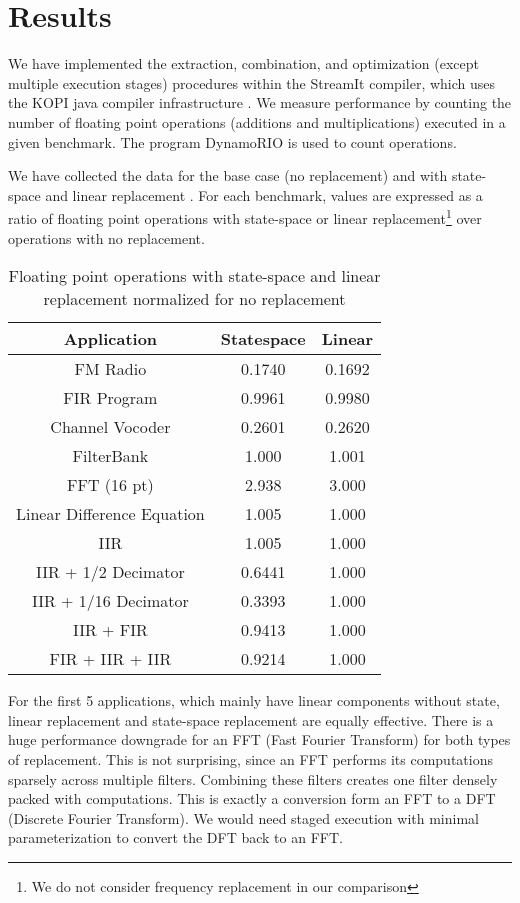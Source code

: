 \chapter{Results}

    We have implemented the extraction, combination, and
optimization (except multiple execution stages) procedures within
the StreamIt compiler, which uses the KOPI java compiler
infrastructure \cite{kopi}. We measure performance by counting the
number of floating point operations (additions and
multiplications) executed in a given benchmark. The program
DynamoRIO \cite{dynamo} is used to count operations.

    We have collected the data for the base case (no replacement) and
with state-space and linear replacement \cite{Lamb}. For each
benchmark, values are expressed as a ratio of floating point
operations with state-space or linear replacement\footnote{We do
not consider frequency replacement in our comparison} over
operations with no replacement.
\begin{center}
\begin{table}[tbp]
\begin{tabular} {c|c|c}
Application & Statespace & Linear \\ \hline
FM Radio & 0.1740 & 0.1692 \\
FIR Program &  0.9961 & 0.9980 \\
Channel Vocoder & 0.2601 & 0.2620 \\
FilterBank & 1.000 & 1.001 \\
FFT (16 pt) & 2.938 & 3.000 \\
Linear Difference Equation & 1.005 & 1.000 \\
IIR & 1.005 & 1.000 \\
IIR + 1/2 Decimator & 0.6441 & 1.000 \\
IIR + 1/16 Decimator & 0.3393 & 1.000 \\
IIR + FIR & 0.9413 & 1.000 \\
FIR + IIR + IIR & 0.9214 & 1.000
\end{tabular}
\caption{Floating point operations with state-space and linear
replacement normalized for no replacement}
\end{table}
\end{center}

    For the first 5 applications, which mainly have linear
components without state, linear replacement and state-space
replacement are equally effective. There is a huge performance
downgrade for an FFT (Fast Fourier Transform) for both types of
replacement. This is not surprising, since an FFT performs its
computations sparsely across multiple filters. Combining these
filters creates one filter densely packed with computations. This
is exactly a conversion form an FFT to a DFT (Discrete Fourier
Transform). We would need staged execution with minimal
parameterization to convert the DFT back to an FFT.

